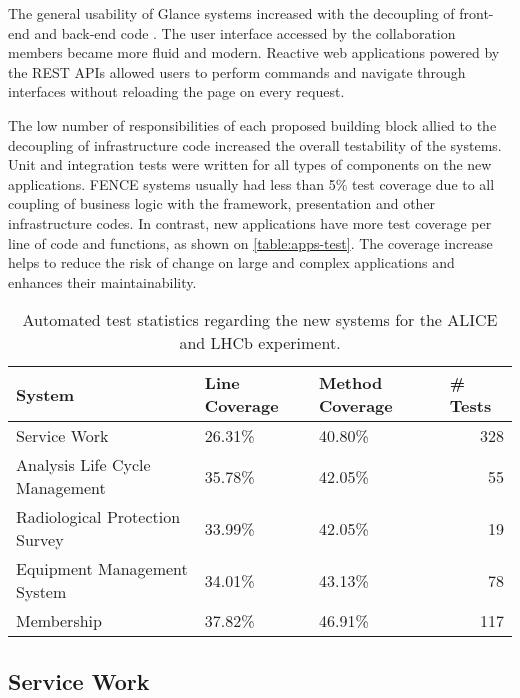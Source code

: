The general usability of Glance systems increased with the decoupling of front-end and back-end code \cite{de-jesus-tcc}. The user interface accessed by the collaboration members became more fluid and modern. Reactive web applications powered by the REST APIs allowed users to perform commands and navigate through interfaces without reloading the page on every request.  

The low number of responsibilities of each proposed building block allied to the decoupling of infrastructure code increased the overall testability of the systems. Unit and integration tests were written for all types of components on the new applications. FENCE systems usually had less than 5\% test coverage due to all coupling of business logic with the framework, presentation and other infrastructure codes. In contrast, new applications have more test coverage per line of code and functions, as shown on \autoref{table:apps-test}. The coverage increase helps to reduce the risk of change on large and complex applications and enhances their maintainability.

\begin{table}[htbp]
\begin{tabular}{|l|l|l|r|}
\hline
System                         & Line Coverage & Method Coverage & \multicolumn{1}{l|}{\# Tests} \\ \hline
Service Work                   & 26.31\%       & 40.80\%         & 328                           \\ 
Analysis Life Cycle Management & 35.78\%       & 42.05\%         & 55                            \\ 
Radiological Protection Survey & 33.99\%       & 42.05\%         & 19                            \\ 
Equipment Management System    & 34.01\%       & 43.13\%         & 78                            \\ 
Membership                     & 37.82\%       & 46.91\%         & 117                           \\ \hline
\end{tabular}
\caption{Automated test statistics regarding the new systems for the ALICE and LHCb experiment.}
\label{table:apps-test}
\end{table}

\subsection{Service Work}

